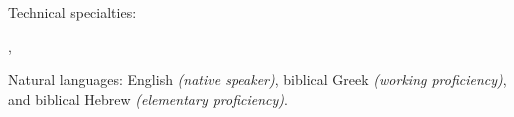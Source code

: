 
\inlineheadsection %
{Technical specialties:}
{ , 

}


\inlineheadsection %
{Natural languages:}
{English \textit{(native speaker)}, biblical Greek \textit{(working proficiency)}, and biblical Hebrew \textit{(elementary proficiency)}.}



